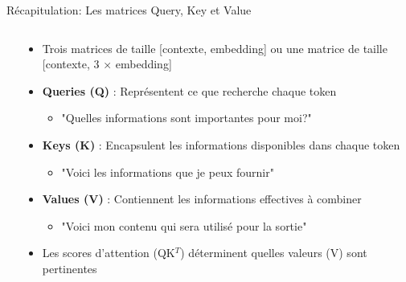 \documentclass[aspectratio=169]{beamer}
\begin{document}
\begin{frame}{Récapitulation: Les matrices Query, Key et Value}
    \begin{columns}
        \begin{column}{0.4\textwidth}
            \begin{center}
            \end{center}
        \end{column}
        \begin{column}{0.6\textwidth}
            \begin{itemize}
                \item Trois matrices de taille [contexte, embedding] ou une matrice de taille [contexte, 3 × embedding]
                \item \textbf{Queries (Q)} : Représentent ce que recherche chaque token
                \begin{itemize}
                    \item "Quelles informations sont importantes pour moi?"
                \end{itemize}
                \item \textbf{Keys (K)} : Encapsulent les informations disponibles dans chaque token
                \begin{itemize}
                    \item "Voici les informations que je peux fournir"
                \end{itemize}
                \item \textbf{Values (V)} : Contiennent les informations effectives à combiner
                \begin{itemize}
                    \item "Voici mon contenu qui sera utilisé pour la sortie"
                \end{itemize}
                \item Les scores d'attention (QK$^T$) déterminent quelles valeurs (V) sont pertinentes
            \end{itemize}
        \end{column}
    \end{columns}
\end{frame}
\end{document}
